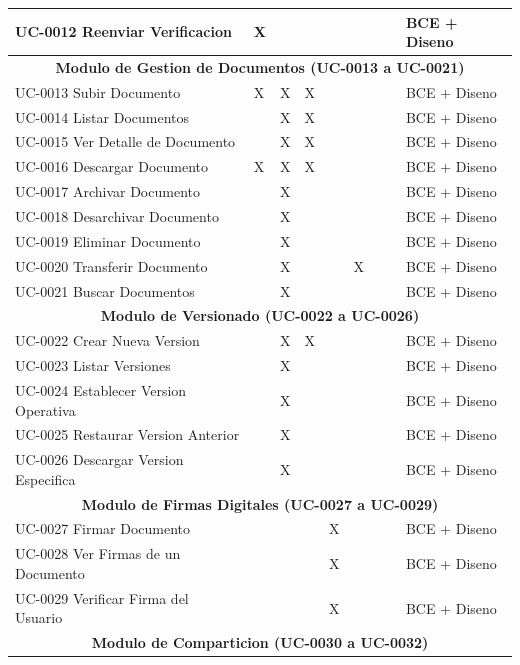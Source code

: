\documentclass[11pt, a4paper]{article}
\begin{document}
{{\begin{center}
{\begin{longtable}{|p{1.5cm}|p{1.0cm}p{0.9cm}p{0.9cm}p{0.9cm}p{0.9cm}p{0.9cm}p{0.9cm}|p{1.5cm}|}
\hline
UC-0012 Reenviar Verificacion & X &  &  &  &  &  &  & BCE + Diseno \\
\hline
\multicolumn{9}{c}{\textbf{Modulo de Gestion de Documentos (UC-0013 a UC-0021)}} \\
\hline
UC-0013 Subir Documento & X & X & X &  &  &  &  & BCE + Diseno \\
\hline
UC-0014 Listar Documentos &  & X & X &  &  &  &  & BCE + Diseno \\
\hline
UC-0015 Ver Detalle de Documento &  & X & X &  &  &  &  & BCE + Diseno \\
\hline
UC-0016 Descargar Documento & X & X & X &  &  &  &  & BCE + Diseno \\
\hline
UC-0017 Archivar Documento &  & X &  &  &  &  &  & BCE + Diseno \\
\hline
UC-0018 Desarchivar Documento &  & X &  &  &  &  &  & BCE + Diseno \\
\hline
UC-0019 Eliminar Documento &  & X &  &  &  &  &  & BCE + Diseno \\
\hline
UC-0020 Transferir Documento &  & X &  &  & X &  &  & BCE + Diseno \\
\hline
UC-0021 Buscar Documentos &  & X &  &  &  &  &  & BCE + Diseno \\
\hline
\multicolumn{9}{c}{\textbf{Modulo de Versionado (UC-0022 a UC-0026)}} \\
\hline
UC-0022 Crear Nueva Version &  & X & X &  &  &  &  & BCE + Diseno \\
\hline
UC-0023 Listar Versiones &  & X &  &  &  &  &  & BCE + Diseno \\
\hline
UC-0024 Establecer Version Operativa &  & X &  &  &  &  &  & BCE + Diseno \\
\hline
UC-0025 Restaurar Version Anterior &  & X &  &  &  &  &  & BCE + Diseno \\
\hline
UC-0026 Descargar Version Especifica &  & X &  &  &  &  &  & BCE + Diseno \\
\hline
\multicolumn{9}{c}{\textbf{Modulo de Firmas Digitales (UC-0027 a UC-0029)}} \\
\hline
UC-0027 Firmar Documento &  &  &  & X &  &  &  & BCE + Diseno \\
\hline
UC-0028 Ver Firmas de un Documento &  &  &  & X &  &  &  & BCE + Diseno \\
\hline
UC-0029 Verificar Firma del Usuario &  &  &  & X &  &  &  & BCE + Diseno \\
\hline
\multicolumn{9}{c}{\textbf{Modulo de Comparticion (UC-0030 a UC-0032)}} \\

\end{longtable}}
\end{center}}}
\end{document}
